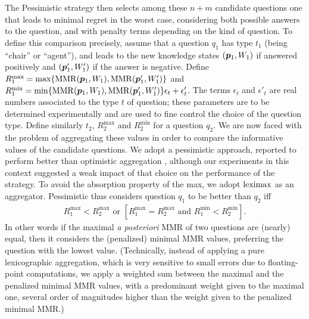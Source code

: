 \documentclass{article}
\begin{document}
The Pessimistic strategy then selects among these $n + m$ candidate questions one that leads to minimal regret in the worst case, considering both possible answers to the question, and with penalty terms depending on the kind of question. To define this comparison precisely, assume that a question $q_1$ has type $t_1$ (being “chair” or “agent”), and leads to the new knowledge states $({\bm{p}}_1, W_1)$ if answered positively and $({\bm{p}}'_1, W'_1)$ if the answer is negative. 
Define $R^{\max}_1 = \max\{\operatorname{MMR}({\bm{p}}_1, W_1), \operatorname{MMR}({\bm{p}}'_1, W'_1)\}$
and $R^{\min}_1 = \min\{\operatorname{MMR}({\bm{p}}_1, W_1), \operatorname{MMR}({\bm{p}}'_1, W'_1)\} \epsilon_{t} + \epsilon'_{t}$.
The terms $\epsilon_t$ and $\epsilon'_{t}$ are real numbers associated to the type $t$ of question; these parameters are to be determined experimentally and are used to fine control the choice of the question type.
Define similarly $t_2$, $R^{\max}_2$ and $R^{\min}_2$ for a question $q_2$.
We are now faced with the problem of aggregating these values in order to compare the informative values of the candidate questions. We adopt a pessimistic approach, reported to perform better than optimistic aggregation \citep{Cailloux2014}, although our experiments in this context suggested a weak impact of that choice on the performance of the strategy.
To avoid the absorption property of the max, we adopt $\operatorname{leximax}$ as an aggregator.
Pessimistic thus considers question $q_1$ to be better  than $q_2$ iff
\begin{align}
	R^{\max}_1 < R^{\max}_2 \text{ or } [R^{\max}_1 = R^{\max}_2 \text{ and } R^{\min}_1 < R^{\min}_2].
\end{align}
In other words if the maximal {\em a posteriori} MMR of two questions are (nearly) equal, then it considers the (penalized) minimal MMR values, preferring the question with the lowest value.
(Technically, instead of applying a pure lexicographic aggregation, which is very sensitive to small errors due to floating-point computations, we apply a weighted sum between the maximal and the penalized minimal MMR values, with a predominant weight given to the maximal one, several order of magnitudes higher than the weight given to the penalized minimal MMR.)
\end{document}
